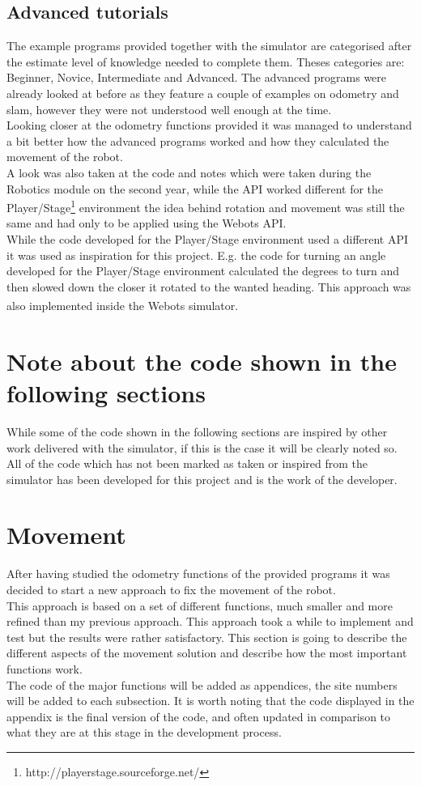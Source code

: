 \subsection{Advanced tutorials}
The example programs provided together with the simulator are categorised after the estimate level of knowledge needed to complete them. Theses categories are: Beginner, Novice, Intermediate and Advanced. The advanced programs were already looked at before as they feature a couple of examples on odometry and slam, however they were not understood  well enough at the time.\\
Looking closer at the odometry functions provided it was managed to understand a bit better how the advanced programs worked and how they calculated the movement of the robot. \\[3ex]

A look was also taken at the code and notes which were taken during the Robotics module on the second year, while the API worked different for the Player/Stage\footnote{http://playerstage.sourceforge.net/} environment the idea behind rotation and movement was still the same and had only to be applied using the Webots API.\\
While the code developed for the Player/Stage environment used a different API it was used as inspiration for this project. E.g. the code for turning an angle developed for the Player/Stage environment calculated the degrees to turn and then slowed down the closer it rotated to the wanted heading. This approach was also implemented inside the Webots\textsuperscript{\texttrademark} simulator.
\section{Note about the code shown in the following sections}
While some of the code shown in the following sections are inspired by other work delivered with the simulator, if this is the case it will be clearly noted so.\\
All of the code which has not been marked as taken or inspired from the simulator has been developed for this project and is the work of the developer.

\section{Movement}
After having studied the odometry functions of the provided programs it was decided to start a new approach to fix the movement of the robot.\\
This approach is based on a set of different functions, much smaller and more refined than my previous approach. This approach took a while to implement and test but the results were rather satisfactory. This section is going to describe the different aspects of the movement solution and describe how the most important functions work.\\
The code of the major functions will be added as appendices, the site numbers will be added to each subsection. It is worth noting that the code displayed in the appendix is the final version of the code, and often updated in comparison to what they are at this stage in the development process.


